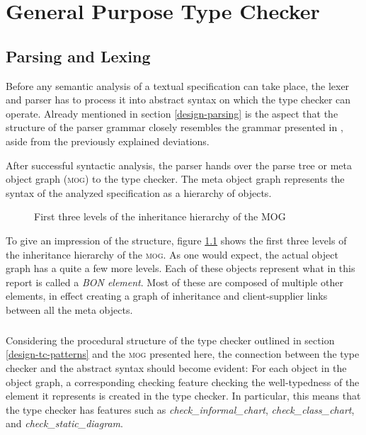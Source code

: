 \chapter{General Purpose Type Checker}
\section{Parsing and Lexing}
\label{implementation-parser}
Before any semantic analysis of a textual \bon{} specification can take place, the lexer and parser has to process it into abstract syntax on which the type checker can operate. Already mentioned in section \ref{design-parsing} is the aspect that the structure of the parser grammar closely resembles the grammar presented in \cite[pp.~352-359]{walden1995}, aside from the previously explained deviations.

After successful syntactic analysis, the parser hands over the parse tree or meta object graph (\textsc{mog}) to the type checker. The meta object graph represents the syntax of the analyzed specification as a hierarchy of objects.
\begin{figure}[H]
    \centerline{}
    \caption[MOG hierarchy]{First three levels of the inheritance hierarchy of the MOG}
    \label{fig:mog-hierarchy}
\end{figure}
To give an impression of the structure, figure \ref{fig:mog-hierarchy} shows the first three levels of the inheritance hierarchy of the \textsc{mog}. As one would expect, the actual object graph has a quite a few more levels. Each of these objects represent what in this report is called a \textit{BON element}. Most of these are composed of multiple other \bon{} elements, in effect creating a graph of inheritance and client-supplier links between all the meta objects.
\paragraph{}
Considering the procedural structure of the type checker outlined in section \ref{design-tc-patterns} and the \textsc{mog} presented here, the connection between the type checker and the abstract syntax should become evident: For each object in the object graph, a corresponding checking feature checking the well-typedness of the \bon{} element it represents is created in the type checker. In particular, this means that the type checker has features such as \textit{check\_informal\_chart}, \textit{check\_class\_chart}, and \textit{check\_static\_diagram}.

